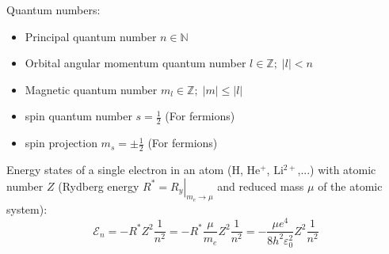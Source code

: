 			\noindent
			Quantum numbers:
			\begin{itemize}
				\item Principal quantum number $n \in \mathbb{N}$
				\item Orbital angular momentum quantum number $l \in \mathbb{Z};\; \left|l\right| < n$
				\item Magnetic quantum number $m_l \in \mathbb{Z};\; \left|m\right| \le \left|l\right|$
				\item spin quantum number $s = \frac{1}{2}$ (For fermions)
				\item spin projection $m_s = \pm \frac{1}{2}$ (For fermions)
			\end{itemize}

			\noindent
			Energy states of a single electron in an atom ($\mathrm{H}$, $\mathrm{He^{+}}$, $\mathrm{Li^{2+}}$,...) with atomic number $Z$ (Rydberg energy $\left.R^*=R_y\right|_{m_e\rightarrow \mu}$ and reduced mass $\mu$ of the atomic system):
			\begin{equation}
				\mathcal{E}_n = -R^* Z^2 \frac{1}{n^2} = -R^* \frac{\mu}{m_e} Z^2 \frac{1}{n^2} = - \frac{\mu e^4}{8 h^2 \varepsilon_0^2} Z^2 \frac{1}{n^2}
			\end{equation}

